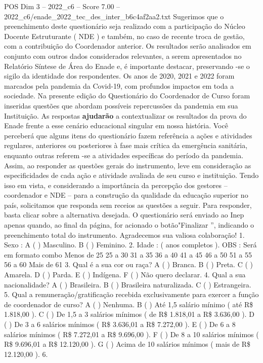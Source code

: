 \begin{textsample}{POS Dim 3 – 2022\_c6 – Score 7.00 – 2022\_c6/enade\_2022\_tec\_des\_inter\_b6c4af2aa2.txt}
Sugerimos que o preenchimento deste questionário seja realizado com a participação do Núcleo Docente Estruturante ( NDE ) e também, no caso de recente troca de gestão, com a contribuição do Coordenador anterior.
Os resultados serão analisados em conjunto com outros dados considerados relevantes, a serem apresentados no Relatório Síntese de Área do Enade e, é importante destacar, preservando -se o sigilo da identidade dos respondentes.
Os anos de 2020, 2021 e 2022 foram marcados pela pandemia da Covid-19, com profundos impactos em toda a sociedade.
Na presente edição do Questionário do Coordenador de Curso foram inseridas questões que abordam possíveis repercussões da pandemia em sua Instituição.
As respostas \textbf{ajudarão} a contextualizar os resultados da prova do Enade frente a esse cenário educacional singular em nossa história.
Você perceberá que alguns itens do questionário fazem referência a ações e atividades regulares, anteriores ou posteriores à fase mais crítica da emergência sanitária, enquanto outras referem -se a atividades específicas do período da pandemia.
Assim, ao responder as questões gerais do instrumento, leve em consideração as especificidades de cada ação e atividade avaliada de seu curso e instituição.
Tendo isso em vista, e considerando a importância da percepção dos gestores – coordenador e NDE – para a construção da qualidade da educação superior no país, solicitamos que responda sem receios as questões a seguir.
Para responder, basta clicar sobre a alternativa desejada.
O questionário será enviado ao Inep apenas quando, ao final da página, for acionado o botão"Finalizar ”, indicando o preenchimento total do instrumento.
Agradecemos sua valiosa colaboração! 1.
Sexo : A ( ) Masculino.
B ( ) Feminino. 2.
Idade : ( anos completos ).
OBS : Será em formato combo Menos de 25 25 a 30 31 a 35 36 a 40 41 a 45 46 a 50 51 a 55 56 a 60 Mais de 61 3.
Qual é a sua cor ou raça?
A ( ) Branca.
B ( ) Preta.
C ( ) Amarela.
D ( ) Parda.
E ( ) Indígena.
F ( ) Não quero declarar. 4.
Qual a sua nacionalidade?
A ( ) Brasileira.
B ( ) Brasileira naturalizada.
C ( ) Estrangeira. 5.
Qual a remuneração/gratificação recebida exclusivamente para exercer a função de coordenador de curso?
A ( ) Nenhuma.
B ( ) Até 1,5 salário mínimo ( até R\$ 1.818,00 ).
C ( ) De 1,5 a 3 salários mínimos ( de R\$ 1.818,01 a R\$ 3.636,00 ).
D ( ) De 3 a 6 salários mínimos ( R\$ 3.636,01 a R\$ 7.272,00 ).
E ( ) De 6 a 8 salários mínimos ( R\$ 7.272,01 a R\$ 9.696,00 ).
F ( ) De 8 a 10 salários mínimos ( R\$ 9.696,01 a R\$ 12.120,00 ).
G ( ) Acima de 10 salários mínimos ( mais de R\$ 12.120,00 ). 6.

\end{textsample}
